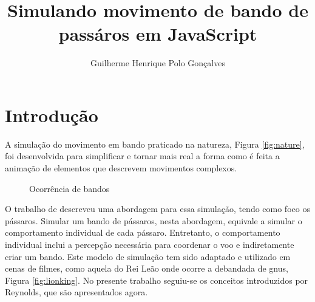 \documentclass[12pt]{article}
\title{Simulando movimento de bando de passáros em JavaScript}
\author{Guilherme Henrique Polo Gonçalves}
\begin{document}
\maketitle




\section{Introdução}
A simulação do movimento em bando praticado na natureza, Figura
\ref{fig:nature}, foi desenvolvida para simplificar e tornar
mais real a forma como é feita a animação de elementos que
descrevem movimentos complexos.

\begin{figure}[h!]
  \centering
  \caption{Ocorrência de bandos}
\end{figure}

O trabalho de \cite{reynolds} descreveu uma abordagem para essa
simulação, tendo como foco os pássaros. Simular um bando de pássaros,
nesta abordagem, equivale a simular o comportamento individual de cada
pássaro. Entretanto, o comportamento individual inclui a percepção
necessária para coordenar o voo e indiretamente criar um
bando. Este modelo de simulação tem sido adaptado e utilizado em cenas
de filmes, como aquela do Rei Leão onde ocorre a debandada de gnus,
Figura \ref{fig:lionking}. No presente trabalho seguiu-se os conceitos
introduzidos por Reynolds, que são apresentados agora.
\end{document}
